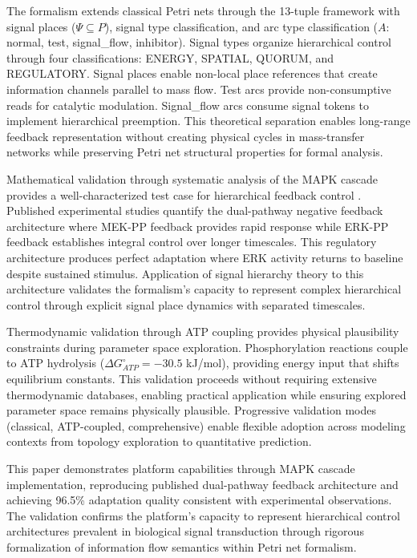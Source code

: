 \documentclass[twocolumn,11pt]{article}
\begin{document}
The formalism extends classical Petri nets \citep{reisig2013} through the 13-tuple framework with signal places ($\Psi \subseteq P$), signal type classification, and arc type classification ($A$: normal, test, signal\_flow, inhibitor). Signal types organize hierarchical control through four classifications: ENERGY, SPATIAL, QUORUM, and REGULATORY. Signal places enable non-local place references that create information channels parallel to mass flow. Test arcs provide non-consumptive reads for catalytic modulation. Signal\_flow arcs consume signal tokens to implement hierarchical preemption. This theoretical separation enables long-range feedback representation without creating physical cycles in mass-transfer networks while preserving Petri net structural properties for formal analysis.

Mathematical validation through systematic analysis of the MAPK cascade provides a well-characterized test case for hierarchical feedback control \citep{kholodenko2000,amit2007,lake2016}. Published experimental studies quantify the dual-pathway negative feedback architecture where MEK-PP feedback provides rapid response while ERK-PP feedback establishes integral control over longer timescales. This regulatory architecture produces perfect adaptation where ERK activity returns to baseline despite sustained stimulus. Application of signal hierarchy theory to this architecture validates the formalism's capacity to represent complex hierarchical control through explicit signal place dynamics with separated timescales.

Thermodynamic validation through ATP coupling provides physical plausibility constraints during parameter space exploration. Phosphorylation reactions couple to ATP hydrolysis ($\Delta G^\circ_{ATP} = -30.5$ kJ/mol), providing energy input that shifts equilibrium constants. This validation proceeds without requiring extensive thermodynamic databases, enabling practical application while ensuring explored parameter space remains physically plausible. Progressive validation modes (classical, ATP-coupled, comprehensive) enable flexible adoption across modeling contexts from topology exploration to quantitative prediction.

This paper demonstrates platform capabilities through MAPK cascade implementation, reproducing published dual-pathway feedback architecture and achieving 96.5\% adaptation quality consistent with experimental observations. The validation confirms the platform's capacity to represent hierarchical control architectures prevalent in biological signal transduction through rigorous formalization of information flow semantics within Petri net formalism.
\end{document}
